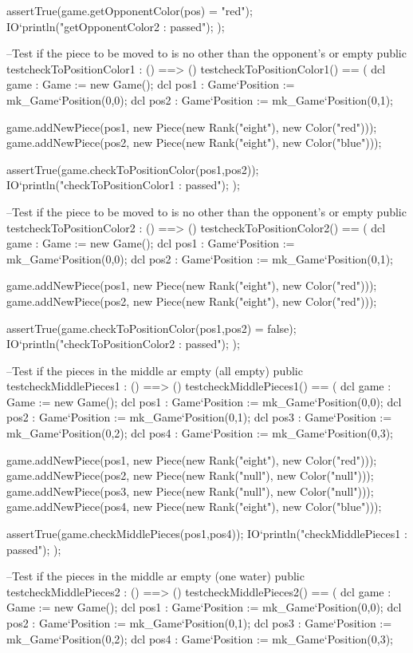 \begin{vdm_al}
    assertTrue(game.getOpponentColor(pos) = "red");
    IO`println("getOpponentColor2 : passed");
   );
  
  --Test if the piece to be moved to is no other than the opponent's or empty
  public testcheckToPositionColor1 : () ==> ()
   testcheckToPositionColor1() ==
   (
    dcl game : Game := new Game();
    dcl pos1 : Game`Position := mk_Game`Position(0,0);
    dcl pos2 : Game`Position := mk_Game`Position(0,1);
    
    game.addNewPiece(pos1, new Piece(new Rank("eight"), new Color("red")));
    game.addNewPiece(pos2, new Piece(new Rank("eight"), new Color("blue")));
    
    assertTrue(game.checkToPositionColor(pos1,pos2));
    IO`println("checkToPositionColor1 : passed");
   );
   
  --Test if the piece to be moved to is no other than the opponent's or empty
  public testcheckToPositionColor2 : () ==> ()
   testcheckToPositionColor2() ==
   (
    dcl game : Game := new Game();
    dcl pos1 : Game`Position := mk_Game`Position(0,0);
    dcl pos2 : Game`Position := mk_Game`Position(0,1);
    
    game.addNewPiece(pos1, new Piece(new Rank("eight"), new Color("red")));
    game.addNewPiece(pos2, new Piece(new Rank("eight"), new Color("red")));
    
    assertTrue(game.checkToPositionColor(pos1,pos2) = false);
    IO`println("checkToPositionColor2 : passed");
   );
  
  --Test if the pieces in the middle ar empty (all empty)
  public testcheckMiddlePieces1 : () ==> ()
   testcheckMiddlePieces1() ==
   (
    dcl game : Game := new Game();
    dcl pos1 : Game`Position := mk_Game`Position(0,0);
    dcl pos2 : Game`Position := mk_Game`Position(0,1);
    dcl pos3 : Game`Position := mk_Game`Position(0,2);
    dcl pos4 : Game`Position := mk_Game`Position(0,3);
    
    game.addNewPiece(pos1, new Piece(new Rank("eight"), new Color("red")));
    game.addNewPiece(pos2, new Piece(new Rank("null"), new Color("null")));
    game.addNewPiece(pos3, new Piece(new Rank("null"), new Color("null")));
    game.addNewPiece(pos4, new Piece(new Rank("eight"), new Color("blue")));
    
    assertTrue(game.checkMiddlePieces(pos1,pos4));
    IO`println("checkMiddlePieces1 : passed");
   );
  
  --Test if the pieces in the middle ar empty (one water)
  public testcheckMiddlePieces2 : () ==> ()
   testcheckMiddlePieces2() ==
   (
    dcl game : Game := new Game();
    dcl pos1 : Game`Position := mk_Game`Position(0,0);
    dcl pos2 : Game`Position := mk_Game`Position(0,1);
    dcl pos3 : Game`Position := mk_Game`Position(0,2);
    dcl pos4 : Game`Position := mk_Game`Position(0,3);
    

\end{vdm_al}
